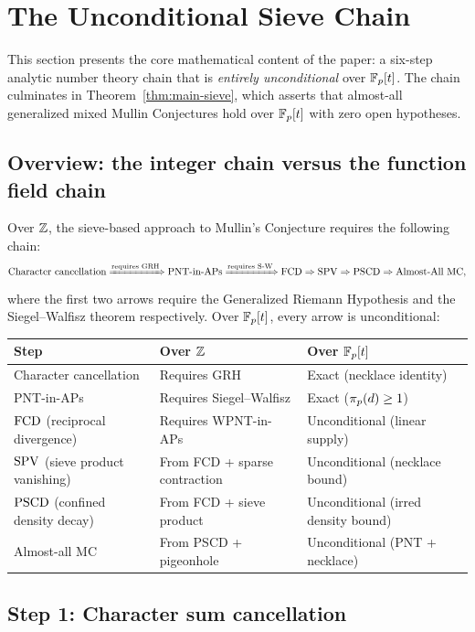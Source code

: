 \section{The Unconditional Sieve Chain}\label{sec:sieve}

This section presents the core mathematical content of the paper: a six-step
analytic number theory chain that is \emph{entirely unconditional} over $\mathbb{F}_p[t]$.
The chain culminates in Theorem~\ref{thm:main-sieve}, which asserts that
almost-all generalized mixed Mullin Conjectures hold over $\mathbb{F}_p[t]$ with zero
open hypotheses.

\subsection{Overview: the integer chain versus the function field chain}

Over $\mathbb{Z}$, the sieve-based approach to Mullin's Conjecture requires the
following chain:
\[
  \text{Character cancellation}
  \xRightarrow{\text{requires GRH}}
  \text{PNT-in-APs}
  \xRightarrow{\text{requires S-W}}
  \mathrm{FCD}
  \Rightarrow \mathrm{SPV} \Rightarrow \mathrm{PSCD}
  \Rightarrow \text{Almost-All MC},
\]
where the first two arrows require the Generalized Riemann Hypothesis and
the Siegel--Walfisz theorem respectively. Over $\mathbb{F}_p[t]$, every arrow is
unconditional:

\begin{center}
\renewcommand{\arraystretch}{1.3}
\begin{tabular}{lll}
\toprule
\textbf{Step} & \textbf{Over $\mathbb{Z}$} & \textbf{Over $\mathbb{F}_p[t]$} \\
\midrule
Character cancellation & Requires GRH & Exact (necklace identity) \\
PNT-in-APs & Requires Siegel--Walfisz & Exact ($\pi_p(d) \geq 1$) \\
$\mathrm{FCD}$ (reciprocal divergence) & Requires WPNT-in-APs & Unconditional (linear supply) \\
$\mathrm{SPV}$ (sieve product vanishing) & From FCD + sparse contraction & Unconditional (necklace bound) \\
$\mathrm{PSCD}$ (confined density decay) & From FCD + sieve product & Unconditional (irred density bound) \\
Almost-all MC & From PSCD + pigeonhole & Unconditional (PNT + necklace) \\
\bottomrule
\end{tabular}
\end{center}

\subsection{Step 1: Character sum cancellation}

